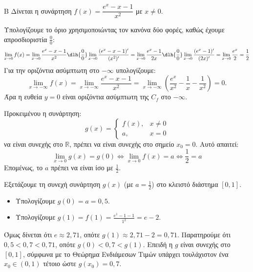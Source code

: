 \begin{thema}{Β}
Δίνεται η συνάρτηση $f(x) = \dfrac{e^x - x - 1}{x^2}$ με $x \ne 0$.
\begin{erwthma}
\item Υπολογίζουμε το όριο χρησιμοποιώντας τον κανόνα  δύο φορές, καθώς έχουμε απροσδιοριστία $\frac{0}{0}$:
\[ \lim_{x\to0} f(x) = \lim_{x\to0} \frac{e^x - x - 1}{x^2} \dlh{\frac{0}{0}} \lim_{x\to0} \frac{(e^x - x - 1)'}{(x^2)'} = \lim_{x\to0} \frac{e^x - 1}{2x} \dlh{\frac{0}{0}} \lim_{x\to0} \frac{(e^x - 1)'}{(2x)'} = \lim_{x\to0} \frac{e^x}{2} = \frac{1}{2} \]
Για την οριζόντια ασύμπτωτη στο $-\infty$ υπολογίζουμε:
\[ \lim_{x\to-\infty} f(x) = \lim_{x\to-\infty} \frac{e^x-x-1}{x^2} = \lim_{x\to-\infty}\left(\frac{e^x}{x^2}-\frac{1}{x}-\frac{1}{x^2}\right)=0. \]
Άρα η ευθεία $y=0$ είναι οριζόντια ασύμπτωτη της $C_f$ στο $-\infty$.

\item Προκειμένου η συνάρτηση:
\[ g(x) = \begin{cases} f(x), & x \ne 0 \\ a, & x = 0 \end{cases} \]
να είναι συνεχής στο $\mathbb{R}$, πρέπει να είναι συνεχής στο σημείο $x_0 = 0$. Αυτό απαιτεί:
\[ \lim_{x\to0} g(x) = g(0) \Leftrightarrow \lim_{x\to0} f(x) = a \Leftrightarrow \frac{1}{2} = a \]
Επομένως, το $a$ πρέπει να είναι ίσο με $\frac{1}{2}$.

\item Εξετάζουμε τη συνεχή συνάρτηση $g(x)$ (με $a=\frac{1}{2}$) στο κλειστό διάστημα $[0, 1]$.
\begin{itemize}
\item Υπολογίζουμε $g(0) = a = 0{,}5$.
\item Υπολογίζουμε $g(1) = f(1) = \frac{e^1 - 1 - 1}{1^2} = e - 2$. 
\end{itemize}
Όμως δίνεται ότι $e \approx 2{,}71$, οπότε $g(1) \approx 2{,}71 - 2 = 0{,}71$.
Παρατηρούμε ότι $0{,}5 < 0{,}7 < 0{,}71$, οπότε $g(0) < 0{,}7 < g(1)$.
Επειδή η $g$ είναι συνεχής στο $[0, 1]$, σύμφωνα με το Θεώρημα Ενδιάμεσων Τιμών υπάρχει τουλάχιστον ένα $x_0 \in (0, 1)$ τέτοιο ώστε $g(x_0) = 0{,}7$.


\end{erwthma}
\end{thema}
